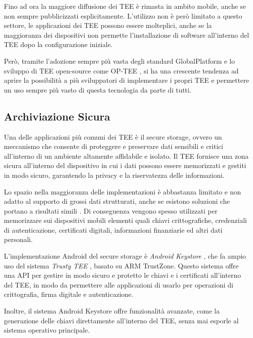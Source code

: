 \documentclass[12pt,italian]{report}
\begin{document}
	Fino ad ora la maggiore diffusione dei TEE è rimasta in ambito mobile, anche se non sempre pubblicizzati esplicitamente. L'utilizzo non è però limitato a questo settore, le applicazioni dei TEE possono essere molteplici, anche se la maggioranza dei dispositivi non permette l'installazione di software all'interno del TEE dopo la configurazione iniziale.
	
	\bigbreak
	
	Però, tramite l'adozione sempre più vasta degli standard GlobalPlatform e lo sviluppo di TEE open-source come OP-TEE \cite{optee}, si ha una crescente tendenza ad aprire la possibilità a più sviluppatori di implementare i propri TEE e permettere un uso sempre più vasto di questa tecnologia da parte di tutti.
	
	
	\subsection{Archiviazione Sicura}
	\label{subsec:secure-storage}
	Una delle applicazioni più comuni dei TEE è il secure storage, ovvero un meccanismo che consente di proteggere e preservare dati sensibili e critici all'interno di un ambiente altamente affidabile e isolato. Il TEE fornisce una zona sicura all'interno del dispositivo in cui i dati possono essere memorizzati e gestiti in modo sicuro, garantendo la privacy e la riservatezza delle informazioni.
	
	Lo spazio nella maggioranza delle implementazioni è abbastanza limitato e non adatto al supporto di grossi dati strutturati, anche se esistono soluzioni che portano a risultati simili \cite{priebe2018enclavedb} \cite{ribeiro2018dbstore}. Di conseguenza vengono spesso utilizzati per memorizzare sui dispositivi mobili elementi quali chiavi crittografiche, credenziali di autenticazione, certificati digitali, informazioni finanziarie ed altri dati personali.
	
	\bigbreak
	
	L'implementazione Android del secure storage è \textit{Android Keystore} \cite{androidkeystore}, che fa ampio uso del sistema \textit{Trusty TEE} \cite{androidtrustytee}, basato su ARM TrustZone. Questo sistema offre una API per gestire in modo sicuro e protetto le chiavi e i certificati all'interno del TEE, in modo da permettere alle applicazioni di usarlo per operazioni di crittografia, firma digitale e autenticazione.
	
	Inoltre, il sistema Android Keystore offre funzionalità avanzate, come la generazione delle chiavi direttamente all'interno del TEE, senza mai esporle al sistema operativo principale. 
	
\end{document}

